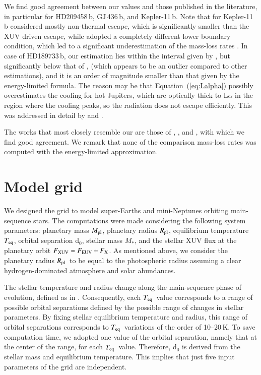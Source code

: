 \documentclass{aa}
\def\Teq{$T_{\rm eq}$}
\def\Rpl{$R_{\rm pl}$}
\def\Mpl{$M_{\rm pl}$}
\begin{document}
We find good agreement between our values and those published in
the literature, in particular for HD209458\,b, GJ\,436\,b, and
Kepler-11\,b. Note that for Kepler-11\,b \citet{kislyakova2014}
considered mostly non-thermal escape, which is significantly
smaller than the XUV driven escape, while \citet{lammer2013}
adopted a completely different lower boundary condition, which led
to a significant underestimation of the mass-loss rates
\citep[see][for more details]{lammer2016}. In case of HD189733\,b,
our estimation {lies within the interval given by}
\citet{bourrier2013}, but significantly {below that of
\citet{guo2016}, (which appears to be} an outlier compared to
other estimations), and it is an order of magnitude {smaller than
that} given by the energy-limited formula. The reason may be that
Equation~(\ref{eq:Lalpha}) possibly overestimates the cooling for
hot Jupiters, which are optically thick to L$\alpha$ in the region
where the cooling peaks, so the radiation does not escape
efficiently. This {was addressed in detail} by \citet{menager2013}
and \citet{koskinen2013}.

The works that most closely {resemble our} are those of
\citet{murray2009}, \citet{guo2016}, and \citet{salz2016}, with
which we find good agreement. We remark that none of the
comparison mass-loss rates was computed with the energy-limited
approximation.
%
\section{Model grid}\label{sec:grid}
%
We designed the grid to model {super-Earths and mini-Neptunes}
orbiting main-sequence stars. The computations were made
considering the following system parameters: planetary mass \Mpl,
planetary radius \Rpl, equilibrium temperature \Teq, orbital
separation d$_0$, stellar mass $M_*$, and the stellar XUV flux at
the planetary orbit $F_{\rm XUV} = F_{\rm EUV} + F_{\rm X}$. {As
mentioned above, we consider the} planetary radius \Rpl\ to be
equal to the photospheric radius assuming a clear
hydrogen-dominated atmosphere and solar abundances.

The stellar temperature and radius change along the main-sequence
phase of evolution, defined as in \citet{yi2001}. Consequently,
each \Teq\ value corresponds to a range of possible orbital
separations defined by the possible range of changes in stellar
parameters. By fixing stellar equilibrium temperature and radius,
this range of orbital separations corresponds to \Teq\ variations
of the order of 10--20\,K. To save computation time, we adopted
one value of the orbital separation, namely that at the center of
the range, for each \Teq\ value. Therefore, d$_0$ is derived from
the stellar mass and equilibrium temperature. {This implies that
just} five input parameters of the grid are independent.
\end{document}

